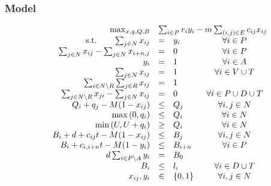\begin{appendices}
\subsubsection*{Model}
\begin{equation}
\begin{array}{rrclcl}
& \max_{x, y, Q, B} & \multicolumn{3}{l}{ \sum_{i \in P} r_i y_i - m \sum_{(i,j) \in E} c_{ij} x_{ij}  } \\  
& \textrm{s.t.} \qquad  \sum_{j \in N} x_{ij}   &=& y_i & \forall i \in P \\   %
& \sum_{j \in N} x_{ij} - \sum_{j \in N} x_{i+n,j}  & = & 0 & \forall i \in P  \\     %
& y_i & =& 1 & \forall i \in A \\  %
& \sum_{j \in N} x_{ij}   &=& 1 & \forall i \in V \cup T \\  %
& \sum_{i \in N \setminus R } \sum_{j \in R }  x_{ij}   &=& 1  &\\     %
& \sum_{j \in N \setminus R } x_{ji} - \sum_{j \in N} x_{ij}  & = & 0 & \forall i \in P \cup D \cup T  \\     %
& Q_i + q_j - M (1-x_{ij} ) &\leq& Q_j & \forall i,j \in N \\  %
& \max{(0, q_i)}    &\leq& Q_i & \forall i \in N \\  %
& \min{(U, U+q_i)}    &\geq& Q_i & \forall i \in N \\  %
& B_i + d + c_{ij} t -  M (1-x_{ij} )  &\leq& B_j   & \forall i,j \in N \\  %
& B_i +  c_{i, i+n} t -  M (1- y_i )  &\leq& B_{i+n}  & \forall i \in P \\ %
&  d \sum_{i \in P \setminus A}  y_i  & = & B_0  \\ %
& B_i  &\leq& l_i  & \forall i \in D \cup T \\ %
& x_{ij}, y_i &\in& \{0, 1\} & \forall i,j \in N  \\ 
\end{array}
\end{equation}

\clearpage


\end{appendices}
